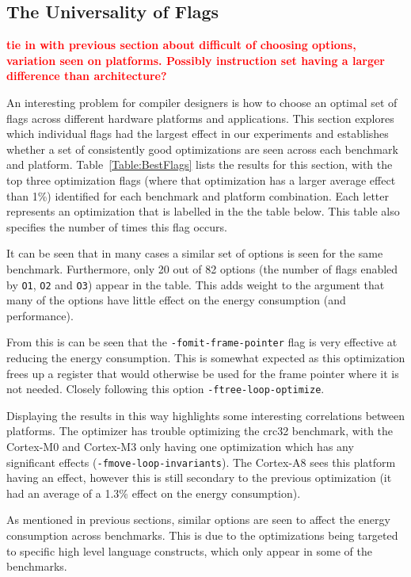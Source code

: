 \documentclass[twocolumn]{article}
\newcommand{\todo}[1]{\textbf{\textcolor{red}{#1}}}
\begin{document}

\subsection{The Universality of Flags}

\todo{tie in with previous section about difficult of choosing options, variation seen on platforms. Possibly instruction set having a larger difference than architecture?}

An interesting problem for compiler designers is how to choose an optimal set of flags across different hardware platforms and applications. This section explores which individual flags had the largest effect in our experiments and establishes whether a set of consistently good optimizations are seen across each benchmark and platform. Table~\ref{Table:BestFlags} lists the results for this section, with the top three optimization flags (where that optimization has a larger average effect than 1\%) identified for each benchmark and platform combination.  Each letter represents an optimization that is labelled in the the table below. This table also specifies the number of times this flag occurs.

It can be seen that in many cases a similar set of options is seen for the same benchmark. Furthermore, only 20 out of 82 options (the number of flags enabled by \texttt{O1}, \texttt{O2} and \texttt{O3}) appear in the table. This adds weight to the argument that many of the options have little effect on the energy consumption (and performance).

From this is can be seen that the \texttt{-fomit-frame-pointer} flag is very effective at reducing the energy consumption. This is somewhat expected as this optimization frees up a register that would otherwise be used for the frame pointer where it is not needed. Closely following this option \texttt{-ftree-loop-optimize}.

Displaying the results in this way highlights some interesting correlations between platforms. The optimizer has trouble optimizing the crc32 benchmark, with the Cortex-M0 and Cortex-M3 only having one optimization which has any significant effects (\texttt{-fmove-loop-invariants}). The Cortex-A8 sees this platform having an effect, however this is still secondary to the previous optimization (it had an average of a 1.3\% effect on the energy consumption).

As mentioned in previous sections, similar options are seen to affect the energy consumption across benchmarks. This is due to the optimizations being targeted to specific high level language constructs, which only appear in some of the benchmarks.
\end{document}
